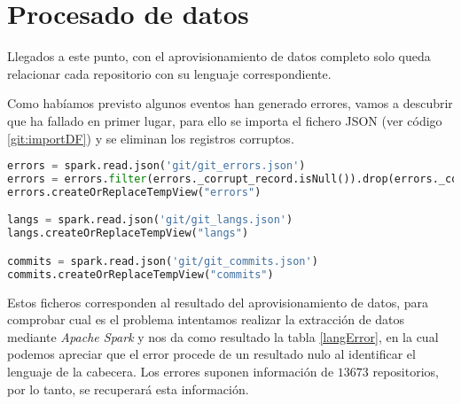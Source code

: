 \section{Procesado de datos}
Llegados a este punto, con el aprovisionamiento de datos completo solo queda relacionar cada repositorio con su lenguaje correspondiente.

Como habíamos previsto algunos eventos han generado errores, vamos a descubrir que ha fallado en primer lugar, para ello se importa el fichero \gls{JSON} (ver código \ref{git:importDF}) y se eliminan los registros corruptos.

\begin{lstlisting}[label=git:importDF,language=python,frame=single,caption={Creación del \textit{DataFrame} y su tabla temporal}]
errors = spark.read.json('git/git_errors.json')
errors = errors.filter(errors._corrupt_record.isNull()).drop(errors._corrupt_record)
errors.createOrReplaceTempView("errors")

langs = spark.read.json('git/git_langs.json')
langs.createOrReplaceTempView("langs")

commits = spark.read.json('git/git_commits.json')
commits.createOrReplaceTempView("commits")
\end{lstlisting}

Estos ficheros corresponden al resultado del aprovisionamiento de datos, para comprobar cual es el problema intentamos realizar la extracción de datos mediante \textit{Apache Spark} y nos da como resultado la tabla \ref{langError}, en la cual podemos apreciar que el error procede de un resultado nulo al identificar el lenguaje de la cabecera. Los errores suponen información de $13673$ repositorios, por lo tanto, se recuperará esta información.

